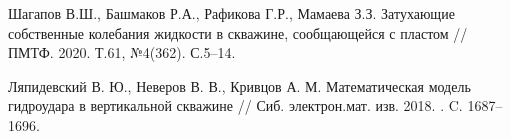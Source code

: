 



%

\begin{thebibliography}{9} %
 Шагапов В.Ш., Башмаков Р.А., Рафикова Г.Р., Мамаева З.З. Затухающие собственные колебания жидкости в скважине, сообщающейся с пластом // ПМТФ. 2020. Т.61, №4(362). С.5--14. 

	Ляпидевский В. Ю., Неверов В. В., Кривцов А. М. Математическая модель гидроудара в вертикальной скважине // Сиб. электрон.мат. изв. 2018. . C. 1687--1696.


\end{thebibliography}





%
